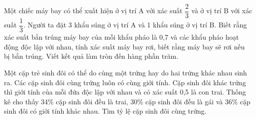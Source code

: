 \begin{ex}%
    Một chiếc máy bay có thể xuất hiện ở vị trí A với xác suất $\dfrac{2}{3}$ và ở vị trí B với xác suất $\dfrac{1}{3}$. Người ta đặt 3 khẩu súng ở vị trí A và 1 khẩu súng ở vị trí B. Biết rằng xác suất bắn trúng máy bay của mỗi khẩu pháo là 0,7 và các khẩu pháo hoạt động độc lập với nhau, tính xác suất máy bay rơi, biết rằng máy bay sẽ rơi nếu bị bắn trúng. Viết kết quả làm tròn đến hàng phần trăm.
\end{ex}
\begin{ex}%
    Một cặp trẻ sinh đôi có thể do cùng một trứng hay do hai trứng khác nhau sinh ra. Các cặp sinh đôi cùng trứng luôn có cùng giới tính. Cặp sinh đôi khác trứng thì giới tính của mỗi đứa độc lập với nhau và có xác suất 0,5 là con trai. Thống kê cho thấy 34\% cặp sinh đôi đều là trai, 30\% cặp sinh đôi đều là gái và 36\% cặp sinh đôi có giới tính khác nhau. Tìm tỷ lệ cặp sinh đôi cùng trứng.
\end{ex}
